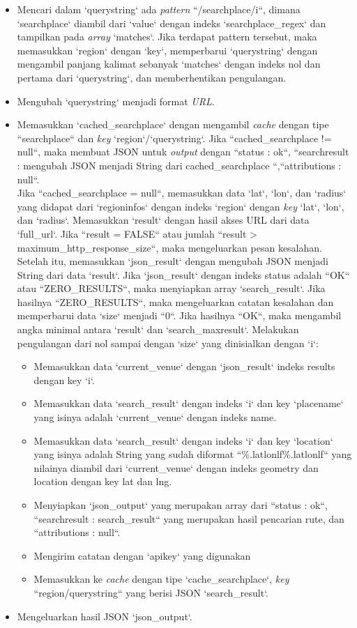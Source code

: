 \begin{itemize}
	\item Mencari dalam `querystring` ada \textit{pattern} ``/searchplace/i``, dimana `searchplace` diambil dari `value` dengan indeks `searchplace\_regex` dan tampilkan pada \textit{array} `matches`. Jika terdapat pattern tersebut, maka memasukkan `region` dengan `key`, memperbarui `querystring` dengan mengambil panjang kalimat sebanyak `matches` dengan indeks nol dan pertama dari `querystring`, dan memberhentikan pengulangan.
	\item Mengubah `querystring` menjadi format \textit{URL}.
	\item Memasukkan `cached\_searchplace` dengan mengambil \textit{cache} dengan tipe ``searchplace`` dan \textit{key} `region`/`querystring`. Jika ``cached\_searchplace != null``, maka membuat JSON untuk \textit{output} dengan ``status : ok``, ``searchresult : mengubah JSON menjadi String dari cached\_searchplace ``,``attributions : null``. \\
	Jika ``cached\_searchplace = null``, memasukkan data `lat`, `lon`, dan `radius` yang didapat dari `regioninfos` dengan indeks `region` dengan \textit{key} `lat`, `lon`, dan `radius`. Memasukkan `result` dengan hasil akses URL dari data `full\_url`. Jika ``result = FALSE`` atau jumlah ``result > maximum\_http\_response\_size``, maka mengeluarkan pesan kesalahan. Setelah itu, memasukkan `json\_result` dengan mengubah JSON menjadi String dari data `result`. Jika `json\_result` dengan indeks status adalah ``OK`` atau ``ZERO\_RESULTS``, maka menyiapkan array `search\_result`. Jika hasilnya ``ZERO\_RESULTS``, maka mengeluarkan catatan kesalahan dan memperbarui data `size` menjadi ``0``. Jika hasilnya ``OK``, maka mengambil angka minimal antara `result` dan `search\_maxresult`. Melakukan pengulangan dari nol sampai dengan `size` yang dinisialkan dengan `i`:
	\begin{itemize}
		\item Memasukkan data `current\_venue` dengan `json\_result` indeks results dengan key `i`.
		\item Memasukkan data `search\_result` dengan indeks `i` dan key `placename` yang isinya adalah `current\_venue` dengan indeks name.
		\item Memasukkan data `search\_result` dengan indeks `i` dan key `location` yang isinya adalah String yang sudah diformat ``\%.latlonlf\%.latlonlf`` yang nilainya diambil dari `current\_venue` dengan indeks geometry dan location dengan key lat dan lng.
		\item Menyiapkan `json\_output` yang merupakan array dari ``status : ok``, ``searchresult : search\_result`` yang merupakan hasil pencarian rute, dan ``attributions : null``.
		\item Mengirim catatan dengan `apikey` yang digunakan
		\item Memasukkan ke \textit{cache} dengan tipe `cache\_searchplace`, \textit{key} ``region/querystring`` yang berisi JSON `search\_result`.
	\end{itemize}
	\item Mengeluarkan hasil JSON `json\_output`.
\end{itemize}

